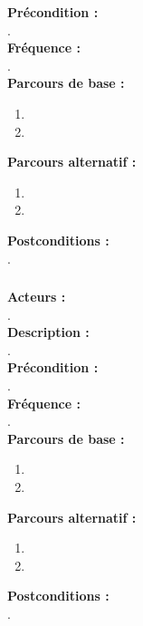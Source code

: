 \documentclass[../rapport.tex]{subfiles}
\begin{document}
\textbf{Précondition :} \\
. \\

\textbf{Fréquence :} \\
. \\

\textbf{Parcours de base :} \\
\begin{enumerate}
    \item 
    \item 
\end{enumerate}
\bigskip

\textbf{Parcours alternatif :}
\begin{enumerate}
    \item 
    \item 
\end{enumerate}

\textbf{Postconditions :} \\
. \\



\subsubsection{}

\textbf{Acteurs :} \\
. \\

\textbf{Description :} \\
. \\

\textbf{Précondition :} \\
. \\

\textbf{Fréquence :} \\
. \\

\textbf{Parcours de base :} \\
\begin{enumerate}
    \item 
    \item 
\end{enumerate}
\bigskip

\textbf{Parcours alternatif :}
\begin{enumerate}
    \item 
    \item 
\end{enumerate}

\textbf{Postconditions :} \\
. \\
\end{document}
